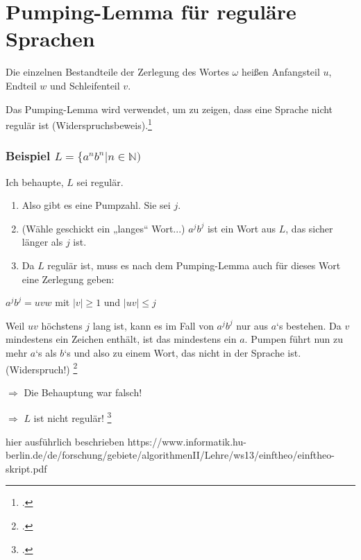\documentclass{lehramt-informatik-haupt}
\begin{document}
\chapter{Pumping-Lemma für reguläre Sprachen}

\noindent
\liPumpingRegulaer

Die einzelnen Bestandteile der Zerlegung des Wortes $\omega$ heißen
Anfangsteil $u$, Endteil $w$ und Schleifenteil $v$.%

\noindent
Das Pumping-Lemma wird verwendet, um zu zeigen, dass eine
Sprache nicht regulär ist (Widerspruchsbeweis).\footcite[Seite 63]{theo:fs:1}

%

\subsection{Beispiel $L = \{a^n b^n | n \in \mathbb{N})$}

Ich behaupte, $L$ sei regulär.

\begin{enumerate}
\item Also gibt es eine Pumpzahl. Sie sei $j$.

\item (Wähle geschickt ein „langes“ Wort...)
$a^j b^j$ ist ein Wort aus $L$, das sicher länger als $j$ ist.

\item Da $L$ regulär ist, muss es nach dem Pumping-Lemma auch für dieses
Wort eine Zerlegung geben:
\end{enumerate}

\begin{center}
$a^j b^j = uvw$ mit $|v| \geq 1$ und $|uv| \leq j$
\end{center}

\noindent
Weil $uv$ höchstens $j$ lang ist, kann es im Fall von $a^j b^j$ nur aus
$a$‘s bestehen. Da $v$ mindestens ein Zeichen enthält, ist das
mindestens ein $a$. Pumpen führt nun zu mehr $a$‘s als $b$‘s und also zu
einem Wort, das nicht in der Sprache ist. (Widerspruch!)
\footcite{wiki:pumping}

$\Rightarrow$ Die Behauptung war falsch!

$\Rightarrow$ $L$ ist nicht regulär!
\footcite[Seite 63-64]{theo:fs:1}

hier ausführlich beschrieben https://www.informatik.hu-berlin.de/de/forschung/gebiete/algorithmenII/Lehre/ws13/einftheo/einftheo-skript.pdf

\literatur
\end{document}
